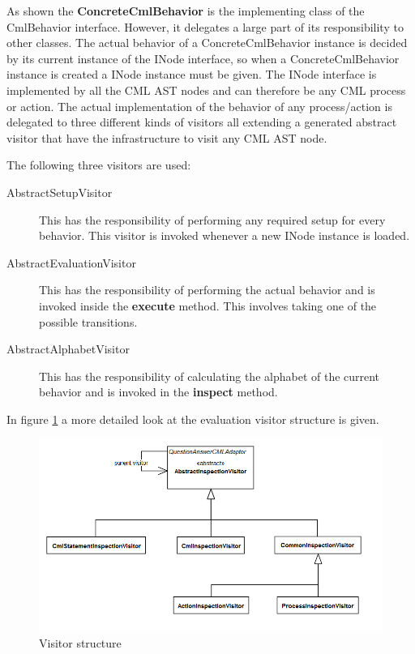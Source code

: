 \documentclass[a4paper, 10pt]{include/compassreport}   %
\begin{document}
As shown the \textbf{ConcreteCmlBehavior} is the implementing class of
the CmlBehavior interface. However, it delegates a large part of its
responsibility to other classes. The actual behavior of a
ConcreteCmlBehavior instance is decided by its current instance of the
INode interface, so when a ConcreteCmlBehavior instance is created a
INode instance must be given. The INode interface is implemented by
all the CML AST nodes and can therefore be any CML process or action.
The actual implementation of the behavior of any process/action is
delegated to three different kinds of visitors all extending a
generated abstract visitor that have the infrastructure to visit any
CML AST node.

The following three visitors are used:  
\begin{description}
\item[AbstractSetupVisitor] This has the responsibility of performing
  any required setup for every behavior. This visitor is invoked
  whenever a new INode instance is loaded.

\item[AbstractEvaluationVisitor] This has the responsibility of
  performing the actual behavior and is invoked inside the \textbf{execute}
  method. This involves taking one of the possible transitions.

\item[AbstractAlphabetVisitor] This has the responsibility of
  calculating the alphabet of the current behavior and is invoked in the
  \textbf{inspect} method.
\end{description}

In figure \ref{fig:visitors} a more detailed look at the evaluation visitor structure is given.  

\begin{figure}[ht!]
  \begin{center}
    \includegraphics[width=1\textwidth]{figures/Visitors}
    \caption{Visitor structure}
    \label{fig:visitors}
  \end{center}
\end{figure}
\end{document}

